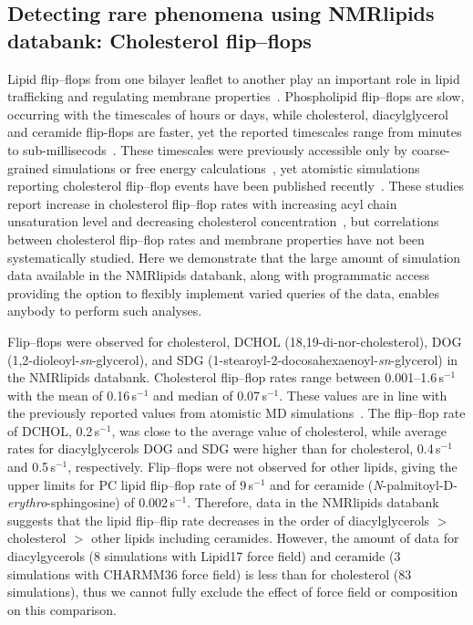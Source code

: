 \documentclass[fleqn,10pt]{wlscirep}
\begin{document}
\subsection{Detecting rare phenomena using NMRlipids databank: Cholesterol flip--flops}
Lipid flip--flops from one bilayer leaflet to another play an important role in lipid trafficking and regulating membrane properties~\cite{vanmeer08}. Phospholipid flip--flops are slow, occurring with the timescales of hours or days, while cholesterol, diacylglycerol and ceramide flip-flops are faster, yet the reported timescales range from minutes to sub-millisecods~\cite{vanmeer08,steck12,parisio16,gu19}. These timescales were previously accessible only by coarse-grained simulations or free energy calculations~\cite{parisio16}, yet atomistic simulations reporting cholesterol flip--flop events have been published recently~\cite{gu19,javanainen19,baral20}. 
These studies report increase in cholesterol flip--flop rates with increasing acyl chain unsaturation level and decreasing cholesterol concentration~\cite{gu19,javanainen19}, but correlations between cholesterol flip--flop rates and membrane properties have not been systematically studied. Here we demonstrate that the large amount of simulation data available in the NMRlipids databank, along with programmatic access providing the option to flexibly implement varied queries of the data, enables anybody to perform such analyses.


Flip--flops were observed for cholesterol, %
DCHOL (18,19-di-nor-cholesterol), %
DOG (1,2-dioleoyl-\textit{sn}-glycerol), %
and SDG (1-stearoyl-2-docosahexaenoyl-\textit{sn}-glycerol) in the NMRlipids databank. Cholesterol flip--flop rates range between 0.001--1.6\,\textmu{}s$^{-1}$ with the mean of 0.16\,\textmu{}s$^{-1}$ and median of 0.07\,\textmu{}s$^{-1}$. These values are in line with the previously reported values from atomistic MD simulations~\cite{gu19,javanainen19,baral20}. The flip--flop rate of DCHOL, 0.2\,\textmu{}s$^{-1}$, was close to the average value of cholesterol, while average rates for diacylglycerols DOG and SDG were higher than for cholesterol, 0.4\,\textmu{}s$^{-1}$ and 0.5\,\textmu{}s$^{-1}$, respectively. Flip--flops were not observed for other lipids, giving the upper limits for PC lipid flip--flop rate of 9\,s$^{-1}$ and for ceramide (\textit{N}-palmitoyl-\textsc{D}-\textit{erythro}-sphingosine) of 0.002\,\textmu{}s$^{-1}$. Therefore, data in the NMRlipids databank suggests that the lipid flip--flip rate decreases in the order of diacylglycerols $>$ cholesterol $>$ other lipids including ceramides. However, the amount of data for diacylgycerols (8 simulations with Lipid17 force field) and ceramide (3 simulations with CHARMM36 force field) is less than for cholesterol (83 simulations), thus we cannot fully exclude the effect of force field or composition on this comparison.
\end{document}
